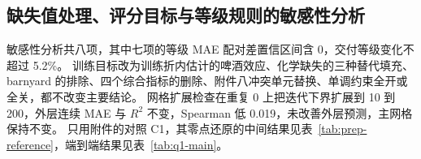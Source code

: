 \subsection{缺失值处理、评分目标与等级规则的敏感性分析}

敏感性分析共八项，其中七项的等级 MAE 配对差置信区间含 0，交付等级变化不超过 5.2\%。
训练目标改为训练折内估计的啤酒效应、化学缺失的三种替代填充、barnyard 的排除、四个综合指标的删除、附件八冲突单元替换、单调约束全开或全关，都不改变主要结论。
网格扩展检查在重复 0 上把迭代下界扩展到 10 到 200，外层连续 MAE 与 $R^2$ 不变，Spearman 低 0.019，未改善外层预测，主网格保持不变。
只用附件的对照 C1，其零点还原的中间结果见表~\ref{tab:prep-reference}，端到端结果见表~\ref{tab:q1-main}。
